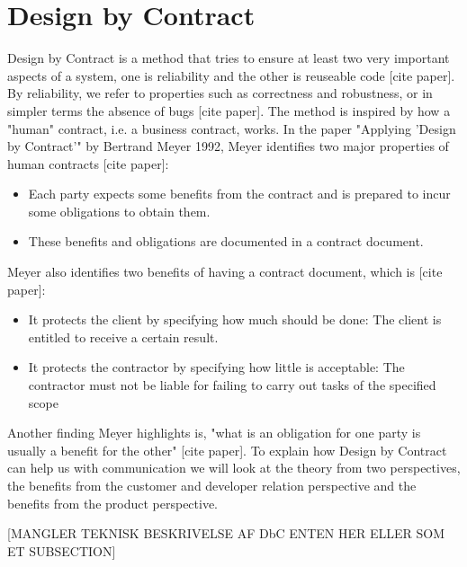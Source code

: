 \section{Design by Contract}

Design by Contract is a method that tries to ensure at least two very important aspects of a system, one is reliability and the other is reuseable code [cite paper].
By reliability, we refer to properties such as correctness and robustness, or in simpler terms the absence of bugs [cite paper].
The method is inspired by how a "human" contract, i.e. a business contract, works.
In the paper "Applying 'Design by Contract'" by Bertrand Meyer 1992, Meyer identifies two major properties of human contracts [cite paper]:
\begin{itemize}
	\item Each party expects some benefits from the contract and is prepared to incur some obligations to obtain them.
	\item These benefits and obligations are documented in a contract document.
\end{itemize}

Meyer also identifies two benefits of having a contract document, which is [cite paper]:
\begin{itemize}
    \item It protects the client by specifying how much should be done: The client is entitled to receive a certain result.
    \item It protects the contractor by specifying how little is acceptable: The contractor must not be liable for failing to carry out tasks of the specified scope
\end{itemize}

Another finding Meyer highlights is, "what is an obligation for one party is usually a benefit for the other" [cite paper].
To explain how Design by Contract can help us with communication we will look at the theory from two perspectives, the benefits from the customer and developer relation perspective and the benefits from the product perspective.

[MANGLER TEKNISK BESKRIVELSE AF DbC ENTEN HER ELLER SOM ET SUBSECTION]

